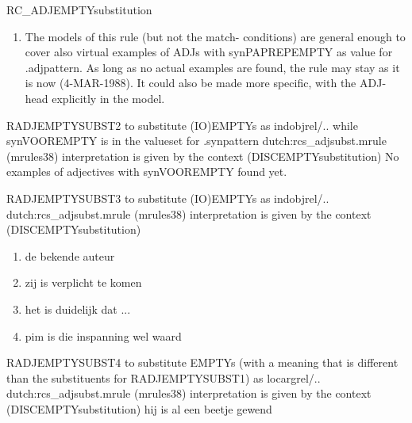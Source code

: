 \begin{mruleclass}{RC\_ADJEMPTYsubstitution}
\begin{members}
\begin{member}
\begin{enumerate}
\item The models of this rule (but not the match-
conditions) are general enough to cover also virtual examples of ADJs with
synPAPREPEMPTY as value for .adjpattern. As long as no actual examples 
are found, the rule may stay as it is now (4-MAR-1988). It could also 
be made more specific, with the ADJ-head explicitly in the model.\\

\end{enumerate}

\end{member}
\begin{member}
 RADJEMPTYSUBST2
 to substitute (IO)EMPTYs as indobjrel/.. while synVOOREMPTY 
is in the valueset for .synpattern
\file dutch:rcs\_adjsubst.mrule (mrules38)
\semantics interpretation is given by the context (DISCEMPTYsubstitution)
\example No examples of adjectives with synVOOREMPTY found yet.
\remarks\mbox{}

\end{member}
\begin{member}
 RADJEMPTYSUBST3
 to substitute (IO)EMPTYs as indobjrel/.. 
\file dutch:rcs\_adjsubst.mrule (mrules38)
\semantics interpretation is given by the context (DISCEMPTYsubstitution)
\example\mbox{}
\begin{enumerate}
\item
  de bekende auteur 
\item zij is verplicht te komen
\item
 het is duidelijk dat ... 
\item
 pim is die inspanning wel waard
\end{enumerate}
\remarks\mbox{}

\end{member}
\begin{member}
 RADJEMPTYSUBST4
 to substitute EMPTYs (with a meaning that is different than 
the substituents for RADJEMPTYSUBST1) as locargrel/..
\file dutch:rcs\_adjsubst.mrule (mrules38)
\semantics interpretation is given by the context (DISCEMPTYsubstitution)
\example  hij is al een beetje gewend
\remarks\mbox{}

\end{member}
\end{members}
\end{mruleclass}


